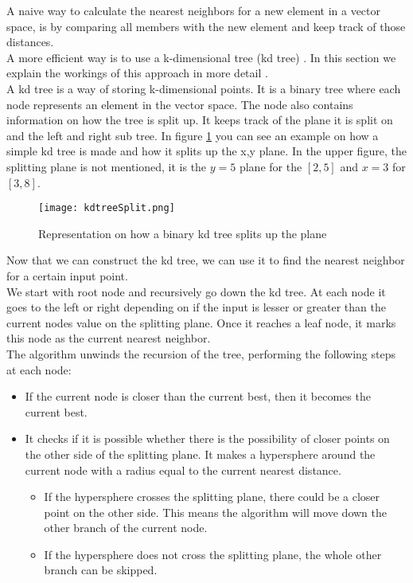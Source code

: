 A naive way to calculate the nearest neighbors for a new element in a vector space, is by comparing all members with the new element and keep track of those distances. \\
A more efficient way is to use a k-dimensional tree (kd tree) \cite{kdtree:article}. In this section we explain the workings of this approach in more detail \cite{kdtreeIntro:atricle}. \\

A kd tree is a way of storing k-dimensional points. It is a binary tree where each node represents an element in the vector space. The node also contains information on how the tree is split up. It keeps track of the plane it is split on and the left and right sub tree. In figure \ref{fig:kdtreeSplit} you can see an example on how a simple kd tree is made and how it splits up the x,y plane. In the upper figure, the splitting plane is not mentioned, it is the $y=5$ plane for the $[2,5]$ and $x=3$ for $[3,8]$. \\
	
\begin{figure}[!htb]
	\centering
	\texttt{[image: kdtreeSplit.png]}
	\caption{Representation on how a binary kd tree splits up the plane  \cite{kdtreeIntro:atricle}}
	\label{fig:kdtreeSplit}
\end{figure}

Now that we can construct the kd tree, we can use it to find the nearest neighbor for a certain input point. \\
We start with root node and recursively go down the kd tree. At each node it goes to the left or right depending on if the input is lesser or greater than the current nodes value on the splitting plane. Once it reaches a leaf node, it marks this node as the current nearest neighbor. \\
The algorithm unwinds the recursion of the tree, performing the following steps at each node:
\begin{itemize}

\item If the current node is closer than the current best, then it becomes the current best.
\item It checks if it is possible whether there is the possibility of closer points on the other side of the splitting plane. It makes a hypersphere around the current node with a radius equal to the current nearest distance. 
\begin{itemize}
\item If the hypersphere crosses the splitting plane, there could be a closer point on the other side. This means the algorithm will move down the other branch of the current node.
\item If the hypersphere does not cross the splitting plane, the whole other branch can be skipped.
\end{itemize}
\end{itemize}

